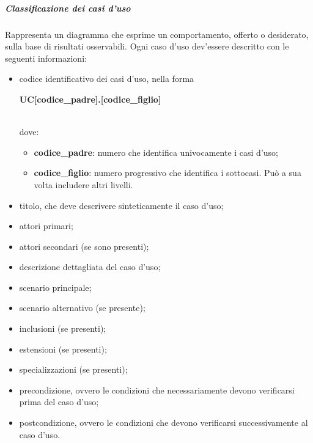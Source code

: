 			\noindent
			\subparagraph{Classificazione dei casi d'uso}
			Rappresenta un diagramma che esprime un comportamento,
			offerto o desiderato, sulla base di risultati osservabili.
			Ogni caso d'uso dev'essere descritto con le seguenti informazioni:
			\begin{itemize}
				\item codice identificativo dei casi d'uso, nella forma \newline \newline
						\centerline{\textbf{UC[codice\_padre].[codice\_figlio]}} \\
						dove:
					\begin{itemize}
							\item \textbf{codice\_padre}: numero che identifica univocamente i casi d'uso;
							\item \textbf{codice\_figlio}: numero progressivo che identifica i sottocasi. Può a sua volta includere altri livelli. \\
					\end{itemize}
				\item titolo, che deve descrivere sinteticamente il caso d'uso;
				\item attori primari;
				\item attori secondari (se sono presenti);
				\item descrizione dettagliata del caso d'uso;
				\item scenario principale;
				\item scenario alternativo (se presente);
				\item inclusioni (se presenti);
				\item estensioni (se presenti);
				\item specializzazioni (se presenti);
				\item precondizione, ovvero le condizioni che necessariamente devono verificarsi prima del caso d'uso;
				\item postcondizione, ovvero le condizioni che devono verificarsi successivamente al caso d'uso. \\
			\end{itemize}
			\noindent
			
